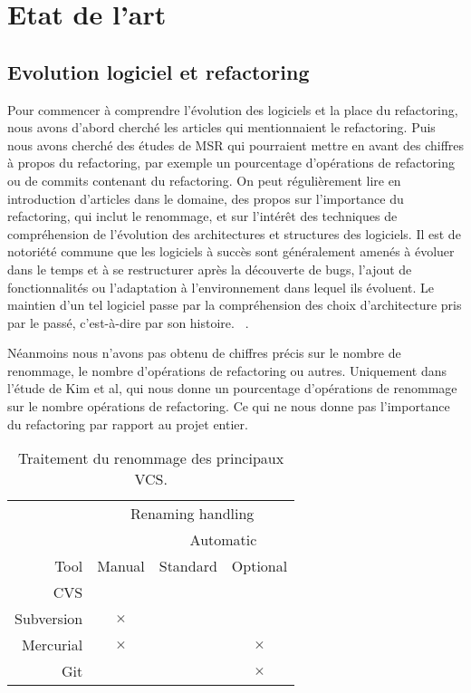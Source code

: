 \section{Etat de l'art}
\label{sec:etat_de_lart}

\subsection{Evolution logiciel et refactoring}
Pour commencer à comprendre l'évolution des logiciels et la place du refactoring, nous avons d'abord cherché les articles qui mentionnaient le refactoring. Puis nous avons cherché des études de MSR qui pourraient mettre en avant des chiffres à propos du refactoring, par exemple un pourcentage d'opérations de refactoring ou de commits contenant du refactoring. On peut régulièrement lire en introduction d'articles dans le domaine, des propos sur l'importance du refactoring, qui inclut le renommage, et sur l'intérêt des techniques de compréhension de l’évolution des architectures et structures des logiciels. Il est de notoriété commune que les logiciels à succès sont généralement amenés à évoluer dans le temps et à se restructurer après la découverte de bugs, l’ajout de fonctionnalités ou l’adaptation à l’environnement dans lequel ils évoluent. Le maintien d’un tel logiciel passe par la compréhension des choix d’architecture pris par le passé, c'est-à-dire par son histoire. ~\cite{tu_integrated_2002,godfrey_tracking_2002,kim_field_2012}.

 Néanmoins nous n'avons pas obtenu de chiffres précis sur le nombre de renommage, le nombre d'opérations de refactoring ou autres. Uniquement dans l'étude de Kim et al, qui nous donne un pourcentage d'opérations de renommage sur le nombre opérations de refactoring. Ce qui ne nous donne pas l'importance du refactoring par rapport au projet entier.\\

\begin{table}[h]
\centering
\begin{tabular}{rccc}
\toprule
 & \multicolumn{3}{c}{Renaming handling}\\
\cmidrule{2-4}
& & \multicolumn{2}{c}{Automatic}\\
\cmidrule{3-4}
Tool & Manual & Standard & Optional\\
\midrule
CVS & & &\\
Subversion & $\times$ & &\\
Mercurial & $\times$ & & $\times$\\
Git & & & $\times$\\
\bottomrule
\end{tabular}
\caption{Traitement du renommage des principaux VCS.}
\label{tab:vcs}
\end{table}

